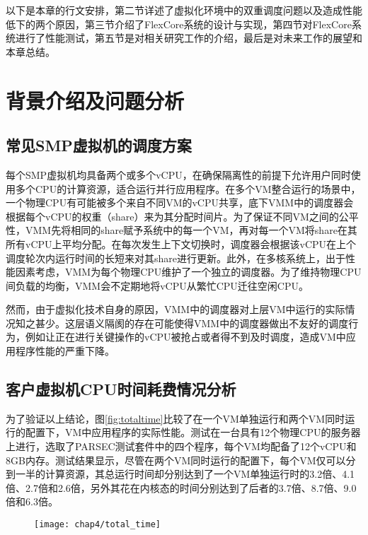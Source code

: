 以下是本章的行文安排，第二节详述了虚拟化环境中的双重调度问题以及造成性能低下的两个原因，第三节介绍了FlexCore系统的设计与实现，第四节对FlexCore系统进行了性能测试，第五节是对相关研究工作的介绍，最后是对未来工作的展望和本章总结。



\section{背景介绍及问题分析}

\subsection{常见SMP虚拟机的调度方案}

每个SMP虚拟机均具备两个或多个vCPU，在确保隔离性的前提下允许用户同时使用多个CPU的计算资源，适合运行并行应用程序。在多个VM整合运行的场景中，一个物理CPU有可能被多个来自不同VM的vCPU共享，底下VMM中的调度器会根据每个vCPU的权重（share）来为其分配时间片。为了保证不同VM之间的公平性，VMM先将相同的share赋予系统中的每一个VM，再对每一个VM将share在其所有vCPU上平均分配。在每次发生上下文切换时，调度器会根据该vCPU在上个调度轮次内运行时间的长短来对其share进行更新。此外，在多核系统上，出于性能因素考虑，VMM为每个物理CPU维护了一个独立的调度器。为了维持物理CPU间负载的均衡，VMM会不定期地将vCPU从繁忙CPU迁往空闲CPU。

然而，由于虚拟化技术自身的原因，VMM中的调度器对上层VM中运行的实际情况知之甚少。这层语义隔阂的存在可能使得VMM中的调度器做出不友好的调度行为，例如让正在进行关键操作的vCPU被抢占或者得不到及时调度，造成VM中应用程序性能的严重下降。

\subsection{客户虚拟机CPU时间耗费情况分析}

为了验证以上结论，图\ref{fig:totaltime}比较了在一个VM单独运行和两个VM同时运行的配置下，VM中应用程序的实际性能。测试在一台具有12个物理CPU的服务器上进行，选取了PARSEC测试套件中的四个程序，每个VM均配备了12个vCPU和8GB内存。测试结果显示，尽管在两个VM同时运行的配置下，每个VM仅可以分到一半的计算资源，其总运行时间却分别达到了一个VM单独运行时的3.2倍、4.1倍、2.7倍和2.6倍，另外其花在内核态的时间分别达到了后者的3.7倍、8.7倍、9.0倍和6.3倍。

\begin{figure}[!htp]
  \centering
  \texttt{[image: chap4/total\_time]}
\end{figure}

